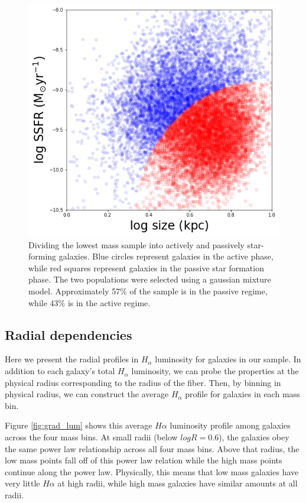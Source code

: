 \documentclass[iop]{emulateapj}
\begin{document}
\begin{figure}
	\centering
	\includegraphics[width=1.5 \columnwidth]{GMM.png}
	\caption{Dividing the lowest mass sample into actively and passively star-forming galaxies. Blue circles represent galaxies in the active phase, while red squares represent galaxies in the passive star formation phase. The two populations were selected using a gaussian mixture model. Approximately 57\% of the sample is in the passive regime, while 43\% is in the active regime.}
     \label{fig:HA_duty}

\end{figure}


\subsection{Radial dependencies}

Here we present the radial profiles in $H_{\alpha}$ luminosity for galaxies in our sample. In addition to each galaxy's total $H_{\alpha}$ luminosity, we can probe the properties at the physical radius corresponding to the radius of the fiber. Then, by binning in physical radius, we can construct the average $H_{\alpha}$ profile for galaxies in each mass bin.

Figure \ref{fig:grad_lum} shows this average $H\alpha$ luminosity profile among galaxies across the four mass bins. At small radii (below $log R =0.6$), the galaxies obey the same power law relationship across all four mass bins. Above that radius, the low mass points fall off of this power law relation while the high mass points continue along the power law. Physically, this means that low mass galaxies have very little $H\alpha$ at high radii, while high mass galaxies have similar amounts at all radii.
\end{document}
